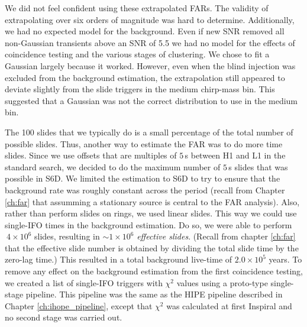 We did not feel confident using these extrapolated \acp{FAR}. The validity of extrapolating over six orders of magnitude was hard to determine. Additionally, we had no expected model for the background. Even if new \ac{SNR} removed all non-Gaussian transients above an \ac{SNR} of 5.5 we had no model for the effects of coincidence testing and the various stages of clustering. We chose to fit a Gaussian largely because it worked. However, even when the blind injection was excluded from the background estimation, the extrapolation still appeared to deviate slightly from the slide triggers in the medium chirp-mass bin. This suggested that a Gaussian was not the correct distribution to use in the medium bin.

The 100 slides that we typically do is a small percentage of the total number of possible slides. Thus, another way to estimate the \ac{FAR} was to do more time slides. Since we use offsets that are multiples of $5\,$s between H1 and L1 in the standard search, we decided to do the maximum number of $5\,$s slides that was possible in S6D. We limited the estimation to S6D to try to ensure that the background rate was roughly constant across the period (recall from Chapter \ref{ch:far} that assumming a stationary source is central to the \ac{FAR} analysis). Also, rather than perform slides on rings, we used linear slides. This way we could use single-\ac{IFO} times in the background estimation. Do so, we were able to perform $~4\times 10^6$ slides, resulting in $\sim 1 \times 10^6$ \emph{effective slides}. (Recall from chapter \ref{ch:far} that the effective slide number is obtained by dividing the total slide time by the zero-lag time.) This resulted in a total background live-time of $2.0\times 10^5$ years. To remove any effect on the background estimation from the first coincidence testing, we created a list of single-\ac{IFO} triggers with $\chi^2$ values using a proto-type single-stage pipeline. This pipeline was the same as the \ac{HIPE} pipeline described in Chapter \ref{ch:ihope_pipeline}, except that $\chi^2$ was calculated at first Inspiral and no second stage was carried out. 

